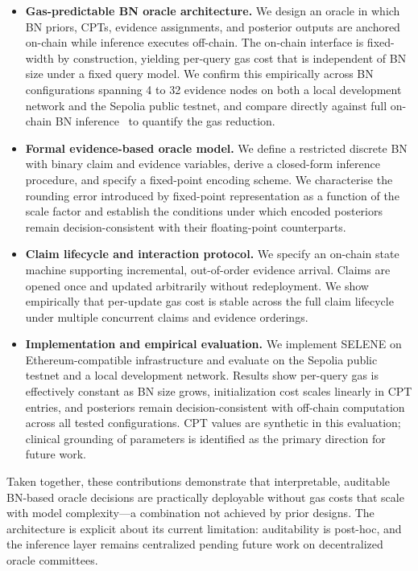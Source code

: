 \documentclass[journal]{IEEEtran}
\begin{document}
\begin{itemize}

  \item \textbf{Gas-predictable BN oracle architecture.}
  We design an oracle in which BN priors, CPTs, evidence
  assignments, and posterior outputs are anchored on-chain
  while inference executes off-chain.
  The on-chain interface is fixed-width by construction,
  yielding per-query gas cost that is independent of BN
  size under a fixed query model.
  We confirm this empirically across BN configurations
  spanning 4 to 32 evidence nodes on both a local
  development network and the Sepolia public testnet,
  and compare directly against full on-chain BN
  inference~\cite{bn-oracle} to quantify the gas
  reduction.

  \item \textbf{Formal evidence-based oracle model.}
  We define a restricted discrete BN with binary claim
  and evidence variables, derive a closed-form inference
  procedure, and specify a fixed-point encoding scheme.
  We characterise the rounding error introduced by
  fixed-point representation as a function of the scale
  factor and establish the conditions under which encoded
  posteriors remain decision-consistent with their
  floating-point counterparts.

  \item \textbf{Claim lifecycle and interaction protocol.}
  We specify an on-chain state machine supporting
  incremental, out-of-order evidence arrival.
  Claims are opened once and updated arbitrarily without
  redeployment.
  We show empirically that per-update gas cost is stable
  across the full claim lifecycle under multiple
  concurrent claims and evidence orderings.

  \item \textbf{Implementation and empirical evaluation.}
  We implement SELENE on Ethereum-compatible infrastructure
  and evaluate on the Sepolia public testnet and a local
  development network.
  Results show per-query gas is effectively constant as
  BN size grows, initialization cost scales linearly in
  CPT entries, and posteriors remain decision-consistent
  with off-chain computation across all tested
  configurations.
  CPT values are synthetic in this evaluation; clinical
  grounding of parameters is identified as the primary
  direction for future work.

\end{itemize}

Taken together, these contributions demonstrate that
interpretable, auditable BN-based oracle decisions are
practically deployable without gas costs that scale with
model complexity---a combination not achieved by prior
designs.
The architecture is explicit about its current
limitation: auditability is post-hoc, and the inference
layer remains centralized pending future work on
decentralized oracle committees.
\end{document}
